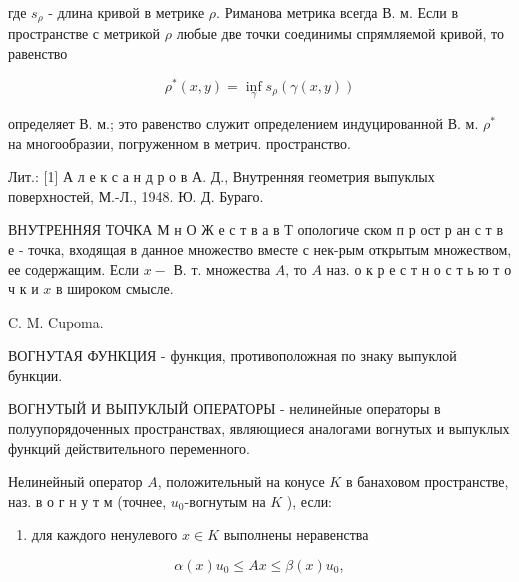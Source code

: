 \documentclass[10pt]{article}
\begin{document}
где $s_{\rho}$ - длина кривой в метрике $\rho$. Риманова метрика всегда В. м. Если в пространстве с метрикой $\rho$ любые две точки соединимы спрямляемой кривой, то равенство



\[

\rho^{*}(x, y)=\inf _{\gamma} s_{\rho}(\gamma(x, y))

\]



определяет В. м.; это равенство служит определением индуцированной В. м. $\rho^{*}$ на многообразии, погруженном в метрич. пространство.



Лит.: [1] А л е к с а н д р о в А. Д., Внутренняя геометрия выпуклых поверхностей, М.-Л., 1948. Ю. Д. Бураго.



ВНУТРЕННЯЯ ТОЧКА М н О Ж е с т в а в Т опологиче ском п р ост р ан с т в е - точка, входящая в данное множество вместе с нек-рым открытым множеством, ее содержащим. Если $x-$ В. т. множества $A$, то $A$ наз. о к р е с т н о с т ь ю т о ч к и $x$ в широком смысле.



C. M. Cupoma.



ВОГНУТАЯ ФУНКЦИЯ - функция, противоположная по знаку выпуклой бункции.



ВОГНУТЫЙ И ВЫПУКЛЫЙ ОПЕРАТОРЫ - нелинейные операторы в полуупорядоченных пространствах, являющиеся аналогами вогнутых и выпуклых функций действительного переменного.



Нелинейный оператор $A$, положительный на конусе $K$ в банаховом пространстве, наз. в о г н у т м (точнее, $u_{0}$-вогнутым на $K$ ), если:



\begin{enumerate}

  \item для каждого ненулевого $x \in K$ выполнены неравенства

\end{enumerate}



\[

\alpha(x) u_{0} \leqslant A x \leqslant \beta(x) u_{0},

\]
\end{document}
